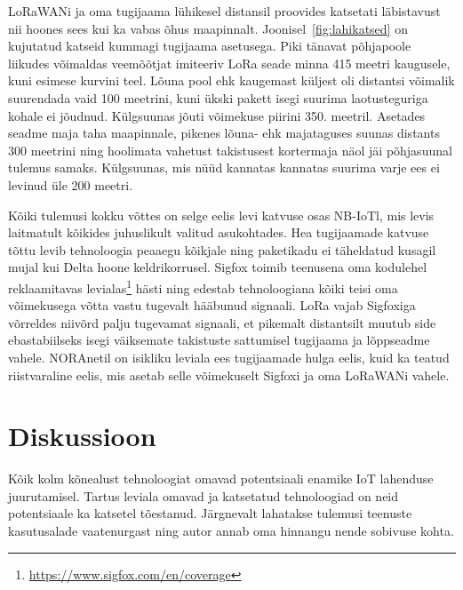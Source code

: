 \documentclass[12pt]{article}
\begin{document}
    LoRaWANi ja oma tugijaama lühikesel distansil proovides katsetati läbistavust nii hoones sees kui ka vabas õhus maapinnalt.
    Joonisel~\ref{fig:lahikatsed} on kujutatud katseid kummagi tugijaama asetusega.
    Piki tänavat põhjapoole liikudes võimaldas veemõõtjat imiteeriv LoRa seade minna 415 meetri kaugusele, kuni esimese kurvini teel.
    Lõuna pool ehk kaugemast küljest oli distantsi võimalik suurendada vaid 100 meetrini, kuni ükski pakett isegi suurima laotusteguriga kohale ei jõudnud.
    Külgsuunas jõuti võimekuse piirini 350. meetril.
    Asetades seadme maja taha maapinnale, pikenes lõuna- ehk majataguses suunas distants 300 meetrini ning hoolimata vahetust takistusest kortermaja näol jäi põhjasuunal tulemus samaks.
    Külgsuunas, mis nüüd kannatas kannatas suurima varje ees ei levinud üle 200 meetri.

    Kõiki tulemusi kokku võttes on selge eelis levi katvuse osas NB-IoTl, mis levis laitmatult kõikides juhuslikult valitud asukohtades.
    Hea tugijaamade katvuse tõttu levib tehnoloogia peaaegu kõikjale ning paketikadu ei täheldatud kusagil mujal kui Delta hoone keldrikorrusel.
    Sigfox toimib teenusena oma kodulehel reklaamitavas levialas\footnote{\url{https://www.sigfox.com/en/coverage}} hästi ning edestab tehnoloogiana kõiki teisi oma võimekusega võtta vastu tugevalt hääbunud signaali.
    LoRa vajab Sigfoxiga võrreldes niivõrd palju tugevamat signaali, et pikemalt distantsilt muutub side ebastabiilseks isegi väiksemate takistuste sattumisel tugijaama ja lõppseadme vahele.
    NORAnetil on isikliku leviala ees tugijaamade hulga eelis, kuid ka teatud riistvaraline eelis, mis asetab selle võimekuselt Sigfoxi ja oma LoRaWANi vahele.

    \newpage

    \section{Diskussioon}

    Kõik kolm kõnealust tehnoloogiat omavad potentsiaali enamike IoT lahenduse juurutamisel.
    Tartus leviala omavad ja katsetatud tehnoloogiad on neid potentsiaale ka katsetel tõestanud.
    Järgnevalt lahatakse tulemusi teenuste kasutusalade vaatenurgast ning autor annab oma hinnangu nende sobivuse kohta.
\end{document}
